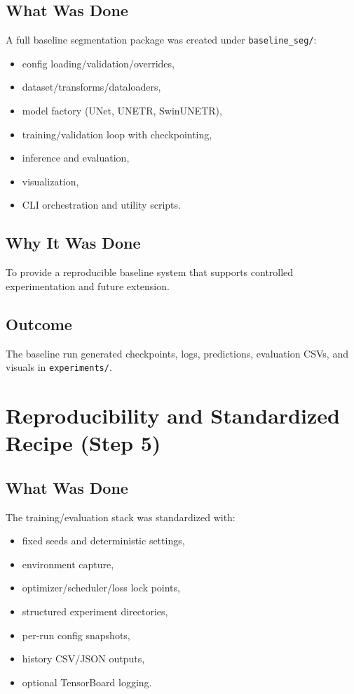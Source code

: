 \documentclass[11pt,a4paper]{article}
\begin{document}
\subsection{What Was Done}
A full baseline segmentation package was created under \texttt{baseline\_seg/}:
\begin{itemize}[leftmargin=1.5em]
  \item config loading/validation/overrides,
  \item dataset/transforms/dataloaders,
  \item model factory (UNet, UNETR, SwinUNETR),
  \item training/validation loop with checkpointing,
  \item inference and evaluation,
  \item visualization,
  \item CLI orchestration and utility scripts.
\end{itemize}

\subsection{Why It Was Done}
To provide a reproducible baseline system that supports controlled experimentation and future extension.

\subsection{Outcome}
The baseline run generated checkpoints, logs, predictions, evaluation CSVs, and visuals in \texttt{experiments/}.

\section{Reproducibility and Standardized Recipe (Step 5)}
\subsection{What Was Done}
The training/evaluation stack was standardized with:
\begin{itemize}[leftmargin=1.5em]
  \item fixed seeds and deterministic settings,
  \item environment capture,
  \item optimizer/scheduler/loss lock points,
  \item structured experiment directories,
  \item per-run config snapshots,
  \item history CSV/JSON outputs,
  \item optional TensorBoard logging.
\end{itemize}
\end{document}
